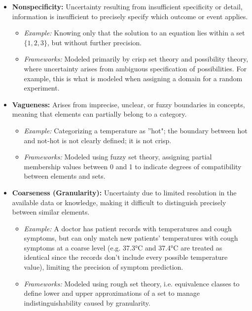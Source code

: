 \begin{itemize}
    \item \textbf{Nonspecificity:} Uncertainty resulting from insufficient specificity or detail, information is insufficient to precisely specify which outcome or event applies. 
    \begin{itemize}
        \item \textit{Example:} Knowing only that the solution to an equation lies within a set \(\{1, 2, 3\}\), but without further precision.
        \item \textit{Frameworks:} Modeled primarily by crisp set theory and possibility theory, where uncertainty arises from ambiguous specification of possibilities. For example, this is what is modeled when assigning a domain for a random experiment.
    \end{itemize}

    \item \textbf{Vagueness:} Arises from imprecise, unclear, or fuzzy boundaries in concepts, meaning that elements can partially belong to a category. 
    \begin{itemize}
        \item \textit{Example:} Categorizing a temperature as ''hot"; the boundary between hot and not-hot is not clearly defined; it is not crisp.
        \item \textit{Frameworks:} Modeled using fuzzy set theory, assigning partial membership values between 0 and 1 to indicate degrees of compatibility between elements and sets.
    \end{itemize}

    \item \textbf{Coarseness (Granularity):} Uncertainty due to limited resolution in the available data or knowledge, making it difficult to distinguish precisely between similar elements.
    \begin{itemize}
        \item \textit{Example:} A doctor has patient records with temperatures and cough symptoms, but can only match new patients' temperatures with cough symptoms at a coarse level (e.g. 37.3°C and 37.4°C are treated as identical since the records don't include every possible temperature value), limiting the precision of symptom prediction.
        \item \textit{Frameworks:} Modeled using rough set theory, i.e. equivalence classes to define lower and upper approximations of a set to manage indistinguishability caused by granularity.
    \end{itemize}


\end{itemize}
